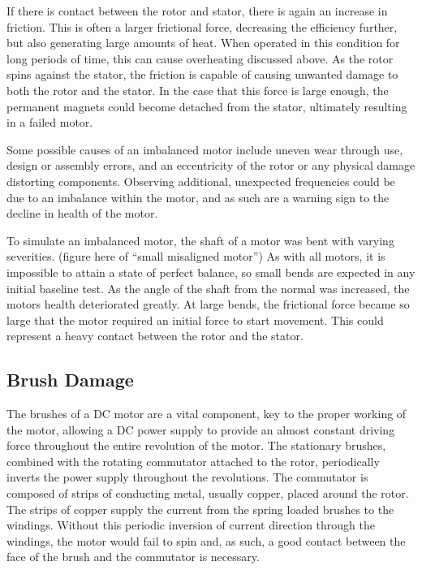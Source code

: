 If there is contact between the rotor and stator, there is again an increase in friction. This is often a larger frictional force, decreasing the efficiency further, but also generating large amounts of heat. When operated in this condition for long periods of time, this can cause overheating discussed above. As the rotor spins against the stator, the friction is capable of causing unwanted damage to both the rotor and the stator. In the case that this force is large enough, the permanent magnets could become detached from the stator, ultimately resulting in a failed motor.

Some possible causes of an imbalanced motor include uneven wear through use, design or assembly errors, and an eccentricity of the rotor or any physical damage distorting components. Observing additional, unexpected frequencies could be due to an imbalance within the motor, and as such are a warning sign to the decline in health of the motor. 

To simulate an imbalanced motor, the shaft of a motor was bent with varying severities. (figure here of “small misaligned motor”) As with all motors, it is impossible to attain a state of perfect balance, so small bends are expected in any initial baseline test. As the angle of the shaft from the normal was increased, the motors health deteriorated greatly. At large bends, the frictional force became so large that the motor required an initial force to start movement. This could represent a heavy contact between the rotor and the stator. 


\subsection{Brush Damage}
The brushes of a DC motor are a vital component, key to the proper working of the motor, allowing a DC power supply to provide an almost constant driving force throughout the entire revolution of the motor. The stationary brushes, combined with the rotating commutator attached to the rotor, periodically inverts the power supply throughout the revolutions. The commutator is composed of strips of conducting metal, usually copper, placed around the rotor. The strips of copper supply the current from the spring loaded brushes to the windings.  Without this periodic inversion of current direction through the windings, the motor would fail to spin and, as such, a good contact between the face of the brush and the commutator is necessary. 


